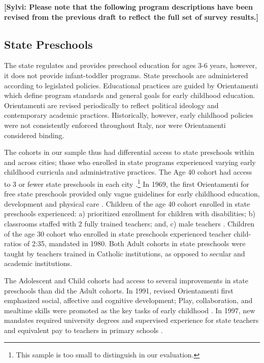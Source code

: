 
\textbf{[Sylvi: Please note that the following program descriptions have been revised from the previous draft to reflect the full set of survey results.]} 

\subsection{State Preschools}

The state regulates and provides preschool education for ages 3-6 years, however, it does not provide infant-toddler programs. State preschools are administered according to legislated policies. Educational practices are guided by Orientamenti which define program standards and general goals for early childhood education. Orientamenti are revised periodically to reflect political ideology and contemporary academic practices. Historically, however, early childhood policies were not consistently enforced throughout Italy, nor were Orientamenti considered binding. 

The cohorts in our sample thus had differential access to state preschools within and across cities; those who enrolled in state programs experienced varying early childhood curricula and administrative practices. The Age 40 cohort had access to 3 or fewer state preschools in each city \citep{Reggio-Admin-data_1966-2006, Reggio-Annual-Journals_1994-2011, Padova-Admin-Data_1964-2011}.\footnote{This sample is too small to distinguish in our evaluation.} In 1969, the first Orientamenti for free state preschools provided only vague guidelines for early childhood education, development and physical care \citep{Corsaro_1996_Early-Edu,Hohnerlein_2015_Development-and-Diffusion}. Children of the age 40 cohort enrolled in state preschools experienced: a) prioritized enrollment for children with disabilities; b) classrooms staffed with 2 fully trained teachers; and, c) male teachers \citep{Hohnerlein_2015_Development-and-Diffusion}. Children of the age 30 cohort who enrolled in state preschools experienced teacher child-ratios of 2:35, mandated in 1980. Both Adult cohorts in state preschools were taught by teachers trained in Catholic institutions, as opposed to secular and academic institutions.

The Adolescent and Child cohorts had access to several improvements in state preschools than did the Adult cohorts. In 1991, revised Orientamenti first emphasized social, affective and cognitive development; Play, collaboration, and mealtime skills were promoted as the key tasks of early childhood \citep{Corsaro_1996_Early-Edu}. In 1997, new mandates required university degrees and supervised experience for state teachers and equivalent pay to teachers in primary schools \citep{Ghedini_2001_Ital-Natl-Policy}. 

